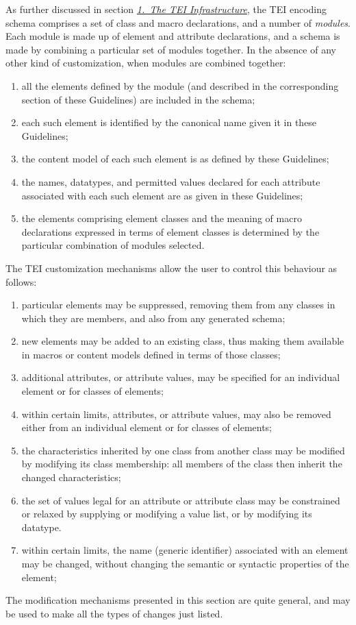 As further discussed in section \textit{\hyperref[ST]{1.\ The TEI Infrastructure}}, the TEI encoding schema comprises a set of class and macro declarations, and a number of \textit{modules}. Each module is made up of element and attribute declarations, and a schema is made by combining a particular set of modules together. In the absence of any other kind of customization, when modules are combined together: \begin{enumerate}
\item all the elements defined by the module (and described in the corresponding section of these Guidelines) are included in the schema;
\item each such element is identified by the canonical name given it in these Guidelines;
\item the content model of each such element is as defined by these Guidelines;
\item the names, datatypes, and permitted values declared for each attribute associated with each such element are as given in these Guidelines;
\item the elements comprising element classes and the meaning of macro declarations expressed in terms of element classes is determined by the particular combination of modules selected.
\end{enumerate} The TEI customization mechanisms allow the user to control this behaviour as follows: \begin{enumerate}
\item particular elements may be suppressed, removing them from any classes in which they are members, and also from any generated schema; 
\item new elements may be added to an existing class, thus making them available in macros or content models defined in terms of those classes;
\item additional attributes, or attribute values, may be specified for an individual element or for classes of elements; 
\item within certain limits, attributes, or attribute values, may also be removed either from an individual element or for classes of elements; 
\item the characteristics inherited by one class from another class may be modified by modifying its class membership: all members of the class then inherit the changed characteristics;
\item the set of values legal for an attribute or attribute class may be constrained or relaxed by supplying or modifying a value list, or by modifying its datatype.
\item within certain limits, the name (generic identifier) associated with an element may be changed, without changing the semantic or syntactic properties of the element;
\end{enumerate} The modification mechanisms presented in this section are quite general, and may be used to make all the types of changes just listed.\par
